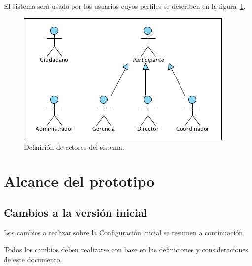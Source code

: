 \documentclass[10pt]{book}
\begin{document}
El sistema será usado por los usuarios cuyos perfiles se describen en la figura~\ref{fig:actores}.

\begin{figure}[htbp!]
	\begin{center}
		\includegraphics[width=.5\textwidth]{images/actores}
		\caption{Definición de actores del sistema.}
		\label{fig:actores}
	\end{center}
\end{figure}

\section{Alcance del prototipo}

\subsection{Cambios a la versión inicial}

	Los cambios a realizar sobre la Configuración inicial se resumen a continuación.

\begin{cambios}
\end{cambios}

Todos los cambios deben realizarse con base en las definiciones y consideraciones de este documento.
\end{document}
